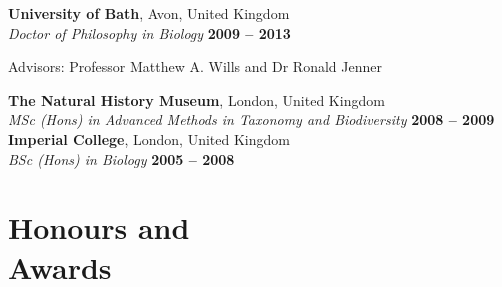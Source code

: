 \documentclass[margin,line]{resume}
\begin{document}
\begin{resume}
    \textbf{University of Bath}, Avon, United Kingdom \vspace{2mm}\\\vspace{1mm}%
    \textsl{Doctor of Philosophy in Biology} \hfill \textbf{2009 -- 2013}\vspace{-3mm}\\\vspace{-1mm}%
    \begin{list2}
        \item Advisors:  Professor Matthew A. Wills and Dr Ronald Jenner
    \end{list2}\vspace{-3mm}
    \textbf{The Natural History Museum}, London, United Kingdom \vspace{0mm}\\\vspace{1mm}%
    \textsl{MSc (Hons) in Advanced Methods in Taxonomy and Biodiversity} \hfill \textbf{2008 -- 2009}\vspace{0mm}\\\vspace{1mm}%
    \textbf{Imperial College}, London, United Kingdom \vspace{-1mm}\\\vspace{1mm}%
    \textsl{BSc (Hons) in Biology} \hfill \textbf{2005 -- 2008}\vspace{1mm}\\

\vspace{-9 mm}
    \section{\mysidestyle Honours and\\Awards} 


\end{resume}
\end{document}
